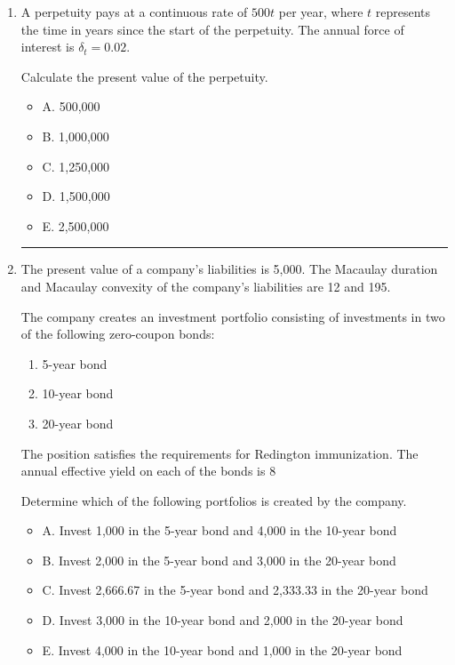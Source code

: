 \documentclass[11pt]{article}
\begin{document}
\begin{enumerate}[label=\textbf{\arabic*.}]

\item A perpetuity pays at a continuous rate of $500t$ per year, where $t$ represents the time in years since the start of the perpetuity. The annual force of interest is $\delta_t = 0.02$.

Calculate the present value of the perpetuity.

\begin{itemize}
\item A. 500,000
\item B. 1,000,000
\item C. 1,250,000
\item D. 1,500,000
\item E. 2,500,000
\end{itemize}

\medskip
\hrule
\medskip

\item The present value of a company’s liabilities is 5,000. The Macaulay duration and Macaulay convexity of the company’s liabilities are 12 and 195.

The company creates an investment portfolio consisting of investments in two of the following zero-coupon bonds:

\begin{enumerate}
\item[(i)] 5-year bond
\item[(ii)] 10-year bond
\item[(iii)] 20-year bond
\end{enumerate}

The position satisfies the requirements for Redington immunization. The annual effective yield on each of the bonds is 8%

Determine which of the following portfolios is created by the company.

\begin{itemize}
\item A. Invest 1,000 in the 5-year bond and 4,000 in the 10-year bond
\item B. Invest 2,000 in the 5-year bond and 3,000 in the 20-year bond
\item C. Invest 2,666.67 in the 5-year bond and 2,333.33 in the 20-year bond
\item D. Invest 3,000 in the 10-year bond and 2,000 in the 20-year bond
\item E. Invest 4,000 in the 10-year bond and 1,000 in the 20-year bond
\end{itemize}


\end{enumerate}
\end{document}
